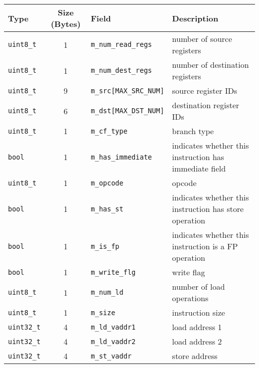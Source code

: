 \vspace{0.2in}
\begin{footnotesize}
\begin{tabular}{l c l l}
Type            & Size (Bytes) & Field                     & Description                                            \\ \hline \hline
\Verb+uint8_t+  & 1            & \Verb+m_num_read_regs+    & number of source registers                             \\
\Verb+uint8_t+  & 1            & \Verb+m_num_dest_regs+    & number of destination registers                        \\
\Verb+uint8_t+  & 9            & \Verb+m_src[MAX_SRC_NUM]+ & source register IDs                                    \\
\Verb+uint8_t+  & 6            & \Verb+m_dst[MAX_DST_NUM]+ & destination register IDs                               \\
\Verb+uint8_t+  & 1            & \Verb+m_cf_type+          & branch type                                            \\
\Verb+bool+     & 1            & \Verb+m_has_immediate+    & indicates whether this instruction has immediate field \\
\Verb+uint8_t+  & 1            & \Verb+m_opcode+           & opcode                                                 \\
\Verb+bool+     & 1            & \Verb+m_has_st+           & indicates whether this instruction has store operation \\
\Verb+bool+     & 1            & \Verb+m_is_fp+            & indicates whether this instruction is a FP operation   \\
\Verb+bool+     & 1            & \Verb+m_write_flg+        & write flag                                             \\
\Verb+uint8_t+  & 1            & \Verb+m_num_ld+           & number of load operations                              \\
\Verb+uint8_t+  & 1            & \Verb+m_size+             & instruction size                                       \\
\Verb+uint32_t+ & 4            & \Verb+m_ld_vaddr1+        & load address 1                                         \\
\Verb+uint32_t+ & 4            & \Verb+m_ld_vaddr2+        & load address 2                                         \\
\Verb+uint32_t+ & 4            & \Verb+m_st_vaddr+         & store address                                          \\

\end{tabular}
\end{footnotesize}
